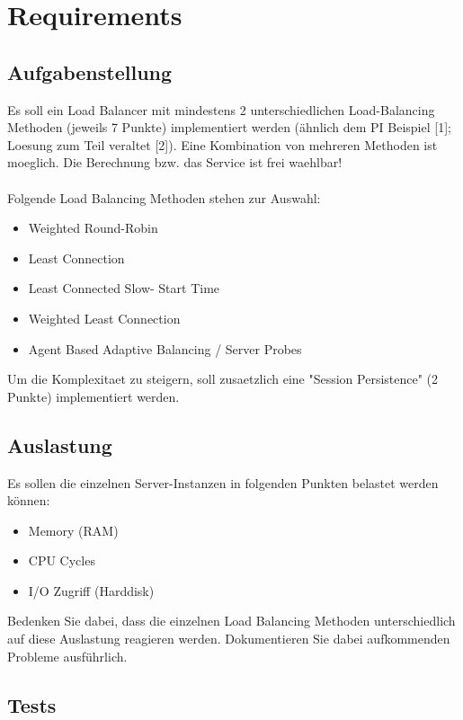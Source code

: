 \documentclass[11pt, a4paper]{article}
\begin{document}
\section{Requirements}

\subsection{Aufgabenstellung}

Es soll ein Load Balancer mit mindestens 2 unterschiedlichen
Load-Balancing Methoden (jeweils 7 Punkte) implementiert werden
(ähnlich dem PI Beispiel [1]; Loesung zum Teil veraltet [2]). Eine
Kombination von mehreren Methoden ist moeglich. Die Berechnung
bzw. das Service ist frei waehlbar!
\\\\
Folgende Load Balancing Methoden stehen zur Auswahl:

\begin{itemize}
	\item Weighted Round-Robin
	\item Least Connection
	\item Least Connected Slow- Start Time
	\item Weighted Least Connection
	\item Agent Based Adaptive Balancing / Server Probes
\end{itemize}

Um die Komplexitaet zu steigern, soll zusaetzlich eine "Session
Persistence" (2 Punkte) implementiert werden.

\subsection{Auslastung}
Es sollen die einzelnen Server-Instanzen in folgenden Punkten belastet werden können:

\begin{itemize}
	\item Memory (RAM)
	\item CPU Cycles
	\item I/O Zugriff (Harddisk)
\end{itemize}

Bedenken Sie dabei, dass die einzelnen Load Balancing Methoden unterschiedlich auf diese Auslastung reagieren werden. Dokumentieren Sie dabei aufkommenden Probleme ausführlich.

\subsection{Tests}
\end{document}
